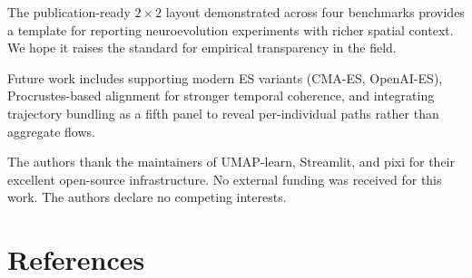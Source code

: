 \documentclass{article}
\begin{document}
The publication-ready $2\!\times\!2$ layout demonstrated across four benchmarks
provides a template for reporting neuroevolution experiments with richer spatial
context.
We hope it raises the standard for empirical transparency in the field.

Future work includes supporting modern ES variants (CMA-ES, OpenAI-ES),
Procrustes-based alignment for stronger temporal coherence, and integrating
trajectory bundling as a fifth panel to reveal per-individual paths rather than
aggregate flows.


\begin{ack}
The authors thank the maintainers of UMAP-learn, Streamlit, and pixi for their
excellent open-source infrastructure.
No external funding was received for this work.
The authors declare no competing interests.
\end{ack}


\section*{References}
\end{document}
